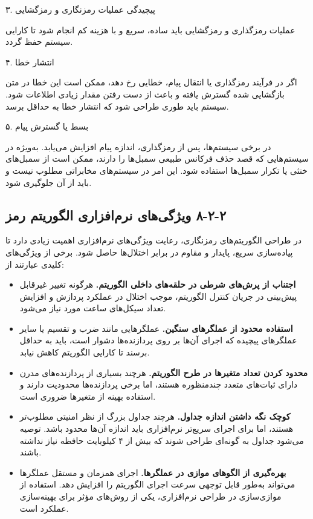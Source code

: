 ۳. پیچیدگی عملیات رمزنگاری و رمزگشایی

عملیات رمزگذاری و رمزگشایی باید ساده، سریع و با هزینه کم انجام شود تا کارایی سیستم حفظ گردد.

۴. انتشار خطا

اگر در فرآیند رمزگذاری یا انتقال پیام، خطایی رخ دهد، ممکن است این خطا در متن بازگشایی شده گسترش یافته و باعث از دست رفتن مقدار زیادی اطلاعات شود. سیستم باید طوری طراحی شود که انتشار خطا به حداقل برسد.

۵. بسط یا گسترش پیام

در برخی سیستم‌ها، پس از رمزگذاری، اندازه پیام افزایش می‌یابد. به‌ویژه در سیستم‌هایی که قصد حذف فرکانس طبیعی سمبل‌ها را دارند، ممکن است از سمبل‌های خنثی یا تکرار سمبل‌ها استفاده شود. این امر در سیستم‌های مخابراتی مطلوب نیست و باید از آن جلوگیری شود.

\subsection{‏۲‏-‏۲‏-‏۸‏ ویژگی‌های نرم‌افزاری الگوریتم رمز}

در طراحی الگوریتم‌های رمزنگاری، رعایت ویژگی‌های نرم‌افزاری اهمیت زیادی دارد تا پیاده‌سازی سریع، پایدار و مقاوم در برابر اختلال‌ها حاصل شود. برخی از ویژگی‌های کلیدی عبارتند از\cite{ref38}:

\begin{itemize}
    \item \textbf{اجتناب از پرش‌های شرطی در حلقه‌های داخلی الگوریتم.} هرگونه تغییر غیرقابل پیش‌بینی در جریان کنترل الگوریتم، موجب اختلال در عملکرد پردازش و افزایش تعداد سیکل‌های ساعت مورد نیاز می‌شود.
    \item \textbf{استفاده محدود از عملگرهای سنگین.} عملگرهایی مانند ضرب و تقسیم یا سایر عملگرهای پیچیده که اجرای آن‌ها بر روی پردازنده‌ها دشوار است، باید به حداقل برسند تا کارایی الگوریتم کاهش نیابد.
    \item \textbf{محدود کردن تعداد متغیرها در طرح الگوریتم.} هرچند بسیاری از پردازنده‌های مدرن دارای ثبات‌های متعدد چندمنظوره هستند، اما برخی پردازنده‌ها محدودیت دارند و استفاده بهینه از متغیرها ضروری است.
    \item \textbf{کوچک نگه داشتن اندازه جداول.} هرچند جداول بزرگ از نظر امنیتی مطلوب‌تر هستند، اما برای اجرای سریع‌تر نرم‌افزاری باید اندازه آن‌ها محدود باشد. توصیه می‌شود جداول به گونه‌ای طراحی شوند که بیش از ۴ کیلوبایت حافظه نیاز نداشته باشند.
    \item \textbf{بهره‌گیری از الگوهای موازی در عملگرها.} اجرای همزمان و مستقل عملگرها می‌تواند به‌طور قابل توجهی سرعت اجرای الگوریتم را افزایش دهد. استفاده از موازی‌سازی در طراحی نرم‌افزاری، یکی از روش‌های مؤثر برای بهینه‌سازی عملکرد است.
\end{itemize}

